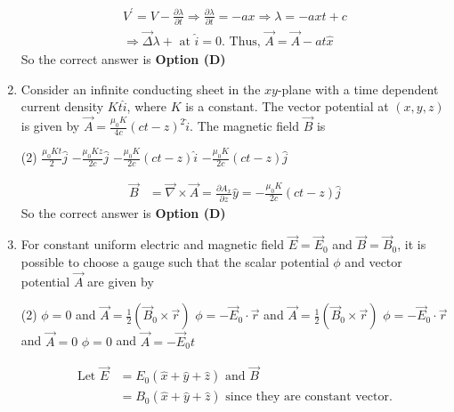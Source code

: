 \begin{enumerate}
\begin{tasks}
	\end{tasks}
\begin{answer}
	\begin{align*}
	V^{\prime}=V-\frac{\partial \lambda}{\partial t} \Rightarrow \frac{\partial \lambda}{\partial t}=-a x \Rightarrow \lambda=-a x t+c\\
	\Rightarrow \vec{\Delta} \lambda+\text{ at }\hat{i}=0 .\text{ Thus, }\vec{A}=\vec{A}-a t \hat{x}
	\end{align*}
	So the correct answer is \textbf{Option (D)}
\end{answer}
	\item  Consider an infinite conducting sheet in the $x y$-plane with a time dependent current density $K t \hat{i}$, where $K$ is a constant. The vector potential at $(x, y, z)$ is given by $\vec{A}=\frac{\mu_{0} K}{4 c}(c t-z)^{2} \hat{i}$. The magnetic field $\vec{B}$ is
	{}
	\begin{tasks}(2)
		\task[\textbf{a.}]$\frac{\mu_{0} K t}{2} \hat{j}$
		\task[\textbf{b.}]$-\frac{\mu_{0} K z}{2 c} \hat{j}$
		\task[\textbf{c.}] $-\frac{\mu_{0} K}{2 c}(c t-z) \hat{i}$
		\task[\textbf{d.}]  $-\frac{\mu_{0} K}{2 c}(c t-z) \hat{j}$
	\end{tasks}
\begin{answer}
	\begin{align*}
	\vec{B}&=\vec{\nabla} \times \vec{A}=\frac{\partial A_{x}}{\partial z} \hat{y}=-\frac{\mu_{0} K}{2 c}(c t-z) \hat{j}
	\end{align*}
	So the correct answer is \textbf{Option (D)}
\end{answer}
	\item  For constant uniform electric and magnetic field $\vec{E}=\vec{E}_{0}$ and $\vec{B}=\vec{B}_{0}$, it is possible to choose a gauge such that the scalar potential $\phi$ and vector potential $\vec{A}$ are given by 
	{}
	\begin{tasks}(2)
		\task[\textbf{a.}]$\phi=0$ and $\vec{A}=\frac{1}{2}\left(\vec{B}_{0} \times \vec{r}\right)$
		\task[\textbf{b.}]$\phi=-\vec{E}_{0} \cdot \vec{r}$ and $\vec{A}=\frac{1}{2}\left(\vec{B}_{0} \times \vec{r}\right)$
		\task[\textbf{c.}]$\phi=-\vec{E}_{0} \cdot \vec{r}$ and $\vec{A}=0$
		\task[\textbf{d.}] $\phi=0$ and $\vec{A}=-\vec{E}_{0} t$
	\end{tasks}
\begin{answer}
	\begin{align*}
	\text{Let }\vec{E}&=E_{0}(\hat{x}+\hat{y}+\hat{z})\text{ and } \vec{B}\\&=B_{0}(\hat{x}+\hat{y}+\hat{z})\text{ since they are constant vector.}\\

\end{align*}
\end{answer}
\end{enumerate}
